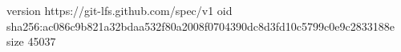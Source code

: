 version https://git-lfs.github.com/spec/v1
oid sha256:ac086c9b821a32bdaa532f80a2008f0704390dc8d3fd10c5799c0e9c2833188e
size 45037
